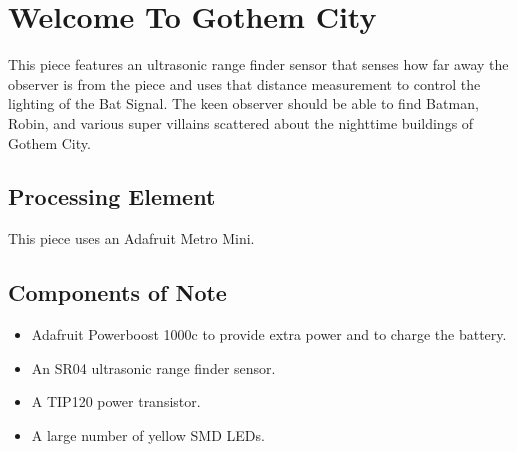 %
%
%
%
% 
%
%
%
%
%
% 
%

\section{Welcome To Gothem City}

This piece features an ultrasonic range finder sensor that senses how far away 
the observer is from the piece and uses that distance measurement to control 
the lighting of the Bat Signal.  The keen observer should be able to find 
Batman, Robin, and various super villains scattered about the nighttime 
buildings of Gothem City.

\subsection*{Processing Element}

This piece uses an Adafruit Metro Mini.

\subsection*{Components of Note}

\begin{itemize}
\item Adafruit Powerboost 1000c to provide extra power and to charge the battery.
\item An SR04 ultrasonic range finder sensor.
\item A TIP120 power transistor.
\item A large number of yellow SMD LEDs.
\end{itemize}

